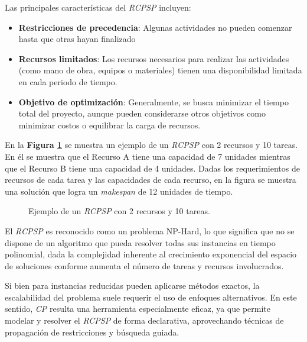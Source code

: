 \documentclass{article}
\begin{document}
Las principales características del \textit{RCPSP} incluyen:
\begin{itemize}
  \item \textbf{Restricciones de precedencia}: Algunas actividades no pueden comenzar hasta que otras hayan finalizado
  \item \textbf{Recursos limitados}: Los recursos necesarios para realizar las actividades (como mano de obra, equipos o materiales) tienen una disponibilidad limitada en cada periodo de tiempo.
  \item \textbf{Objetivo de optimización}: Generalmente, se busca minimizar el tiempo total del proyecto, aunque pueden considerarse otros objetivos como minimizar costos o equilibrar la carga de recursos.
\end{itemize}

En la \textbf{Figura \ref{fig:rcpsp}} se muestra un ejemplo de un \textit{RCPSP} con 2 recursos y 10 tareas. En él se muestra que el Recurso A tiene una capacidad de 7 unidades mientras que el Recurso B tiene una capacidad de 4 unidades. Dadas los requerimientos de recursos de cada tarea y las capacidades de cada recurso, en la figura se muestra una solución que logra un \textit{makespan} de 12 unidades de tiempo.

\begin{figure}[htbp]
    \centering
    \caption{Ejemplo de un \textit{RCPSP} con 2 recursos y 10 tareas.}
    \label{fig:rcpsp}
\end{figure}
    

El \textit{RCPSP} es reconocido como un problema NP-Hard, lo que significa que no se dispone de un algoritmo que pueda resolver todas sus instancias en tiempo polinomial, dada la complejidad inherente al crecimiento exponencial del espacio de soluciones conforme aumenta el número de tareas y recursos involucrados.

Si bien para instancias reducidas pueden aplicarse métodos exactos, la escalabilidad del problema suele requerir el uso de enfoques alternativos. En este sentido, \textit{CP} resulta una herramienta especialmente eficaz, ya que permite modelar y resolver el \textit{RCPSP} de forma declarativa, aprovechando técnicas de propagación de restricciones y búsqueda guiada.
\end{document}

